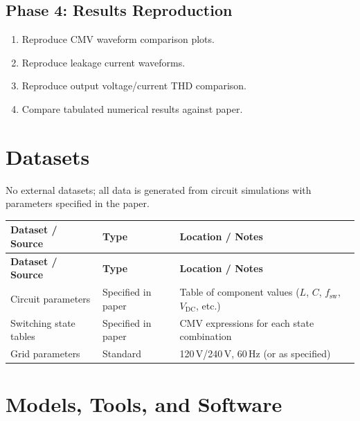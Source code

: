 \documentclass[11pt,a4paper]{article}
\begin{document}
\subsection{Phase 4: Results Reproduction}
\begin{enumerate}[label=\textbf{4.\arabic*}]
  \item Reproduce CMV waveform comparison plots.
  \item Reproduce leakage current waveforms.
  \item Reproduce output voltage/current THD comparison.
  \item Compare tabulated numerical results against paper.
\end{enumerate}

\section{Datasets}
No external datasets; all data is generated from circuit simulations with parameters specified in the paper.

\begin{longtable}{p{4.5cm} p{3.5cm} p{6cm}}
\toprule
\textbf{Dataset / Source} & \textbf{Type} & \textbf{Location / Notes} \\
\midrule
\endfirsthead
\toprule
\textbf{Dataset / Source} & \textbf{Type} & \textbf{Location / Notes} \\
\midrule
\endhead
Circuit parameters & Specified in paper & Table of component values ($L$, $C$, $f_{\text{sw}}$, $V_{\text{DC}}$, etc.) \\
\midrule
Switching state tables & Specified in paper & CMV expressions for each state combination \\
\midrule
Grid parameters & Standard & 120\,V/240\,V, 60\,Hz (or as specified) \\
\bottomrule
\end{longtable}

\section{Models, Tools, and Software}
\end{document}
